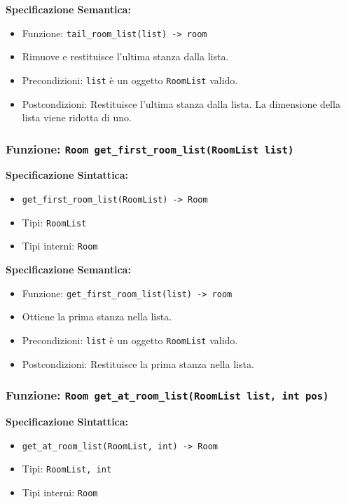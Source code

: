 \documentclass[11pt]{scrartcl} %
\begin{document}
\textbf{Specificazione Semantica:}
\begin{itemize}
\item Funzione: \texttt{tail\_room\_list(list) -> room}
\item Rimuove e restituisce l'ultima stanza dalla lista.
\item Precondizioni: \texttt{list} è un oggetto \texttt{RoomList} valido.
\item Postcondizioni: Restituisce l'ultima stanza dalla lista. La dimensione della lista viene ridotta di uno.
\end{itemize}

\subsubsection{Funzione: \texttt{Room get\_first\_room\_list(RoomList list)}}

\textbf{Specificazione Sintattica:}
\begin{itemize}
\item \texttt{get\_first\_room\_list(RoomList) -> Room}
\item Tipi: \texttt{RoomList}
\item Tipi interni: \texttt{Room}
\end{itemize}

\textbf{Specificazione Semantica:}
\begin{itemize}
\item Funzione: \texttt{get\_first\_room\_list(list) -> room}
\item Ottiene la prima stanza nella lista.
\item Precondizioni: \texttt{list} è un oggetto \texttt{RoomList} valido.
\item Postcondizioni: Restituisce la prima stanza nella lista.
\end{itemize}

\subsubsection{Funzione: \texttt{Room get\_at\_room\_list(RoomList list, int pos)}}

\textbf{Specificazione Sintattica:}
\begin{itemize}
\item \texttt{get\_at\_room\_list(RoomList, int) -> Room}
\item Tipi: \texttt{RoomList, int}
\item Tipi interni: \texttt{Room}
\end{itemize}
\end{document}
